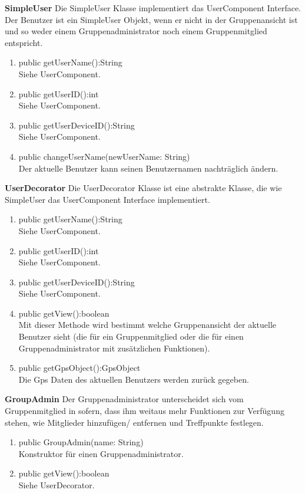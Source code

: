 \textbf{SimpleUser}
Die SimpleUser Klasse implementiert das UserComponent Interface. Der Benutzer ist ein SimpleUser Objekt, wenn er nicht in der Gruppenansicht ist und so weder einem Gruppenadministrator noch einem Gruppenmitglied entspricht.
\begin{enumerate}
	\item public getUserName():String\\
		Siehe UserComponent.
	\item public getUserID():int\\
		Siehe UserComponent.
	\item public getUserDeviceID():String\\
		Siehe UserComponent.
	\item public changeUserName(newUserName: String)\\
	Der aktuelle Benutzer kann seinen Benutzernamen nachträglich ändern.
\end{enumerate}

\textbf{UserDecorator}
Die UserDecorator Klasse ist eine abstrakte Klasse, die wie SimpleUser das UserComponent Interface implementiert. 
\begin{enumerate}
	\item public getUserName():String\\
		Siehe UserComponent.
	\item public getUserID():int\\
		Siehe UserComponent.
	\item public getUserDeviceID():String\\
		Siehe UserComponent.
	\item public getView():boolean\\
		Mit dieser Methode wird bestimmt welche Gruppenansicht der aktuelle Benutzer sieht (die für ein Gruppenmitglied oder die für einen Gruppenadministrator mit zusätzlichen Funktionen).
	\item public getGpsObject():GpsObject\\
		Die Gps Daten des aktuellen Benutzers werden zurück gegeben.
\end{enumerate}

\textbf{GroupAdmin}
Der Gruppenadministrator unterscheidet sich vom Gruppenmitglied in sofern, dass ihm weitaus mehr Funktionen zur Verfügung stehen, wie Mitglieder hinzufügen/ entfernen und Treffpunkte festlegen.
\begin{enumerate}
	\item public GroupAdmin(name: String)\\
		Konstruktor für einen Gruppenadministrator.
	\item public getView():boolean\\
		Siehe UserDecorator.
\end{enumerate}

